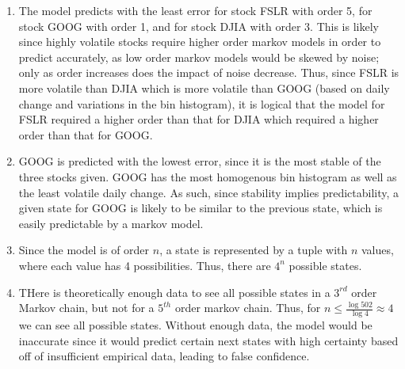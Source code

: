 \documentclass{article}
\begin{document}
\begin{enumerate}
    \item The model predicts with the least error for stock FSLR with order 5, for stock GOOG with order 1, and for stock DJIA with order 3. This is likely since highly volatile stocks require higher order markov models in order to predict accurately, as low order markov models would be skewed by noise; only as order increases does the impact of noise decrease. Thus, since FSLR is more volatile than DJIA which is more volatile than GOOG (based on daily change and variations in the bin histogram), it is logical that the model for FSLR required a higher order than that for DJIA which required a higher order than that for GOOG. 
    
    \item GOOG is predicted with the lowest error, since it is the most stable of the three stocks given. GOOG has the most homogenous bin histogram as well as the least volatile daily change. As such, since stability implies predictability, a given state for GOOG is likely to be similar to the previous state, which is easily predictable by a markov model. 
    
    \item Since the model is of order $n$, a state is represented by a tuple with $n$ values, where each value has 4 possibilities. Thus, there are $4^n$ possible states. 
    
    \item THere is theoretically enough data to see all possible states in a $3^{rd}$ order Markov chain, but not for a $5^{th}$ order markov chain. Thus, for $n \leq \frac{\log{502}}{\log{4}} \approx 4$ we can see all possible states. Without enough data, the model would be inaccurate since it would predict certain next states with high certainty based off of insufficient empirical data, leading to false confidence. 
\end{enumerate}
\end{document}
